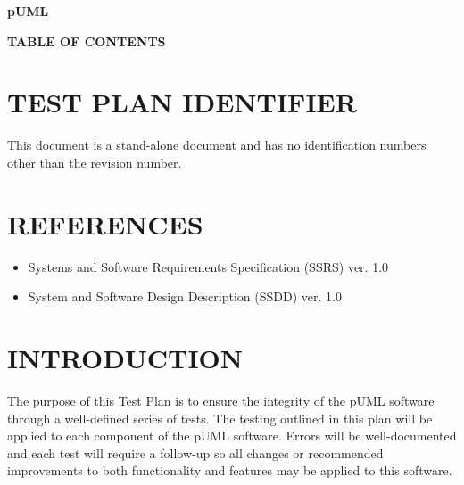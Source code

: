 \documentclass[twoside,letterpaper]{article}
\begin{document}
\clearpage

{\centering\bfseries
pUML
\par}

{\centering\bfseries
TABLE OF CONTENTS
\par}


\setcounter{tocdepth}{1}
\renewcommand\contentsname{}
\tableofcontents

\bigskip

\bigskip

\setcounter{page}{1}\pagestyle{Convertiv}

\clearpage

\section[IDENTIFIER]{\bfseries TEST PLAN IDENTIFIER}

This document is a stand-alone document and has no identification numbers other than the revision number.

\section[REFERENCES]{\bfseries REFERENCES}

\begin{itemize}
\item   Systems and Software Requirements Specification (SSRS) ver. 1.0
\item   System and Software Design Description (SSDD) ver. 1.0
\end{itemize}

\section[INTRODUCTION]{\bfseries INTRODUCTION}

The purpose of this Test Plan is to ensure the integrity of the pUML software through a well-defined series of tests. The testing outlined in this plan will be applied to each component of the pUML software. Errors will be well-documented and each test will require a follow-up so all changes or recommended improvements to both functionality and features may be applied to this software.
\end{document}
